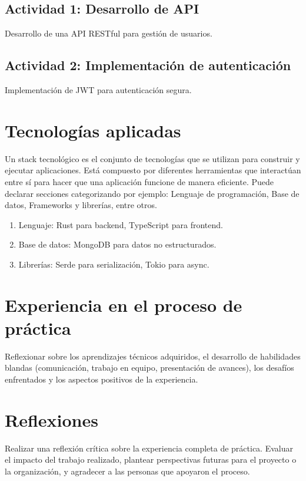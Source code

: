 \documentclass[12pt, a4paper]{article}
\begin{document}
\subsection{Actividad 1: Desarrollo de API}
Desarrollo de una API RESTful para gestión de usuarios.

\subsection{Actividad 2: Implementación de autenticación}
Implementación de JWT para autenticación segura.

\section{Tecnologías aplicadas}
Un stack tecnológico es el conjunto de tecnologías que se utilizan para construir y ejecutar aplicaciones. Está compuesto por diferentes herramientas que interactúan entre sí para hacer que una aplicación funcione de manera eficiente. Puede declarar secciones categorizando por ejemplo: Lenguaje de programación, Base de datos, Frameworks y librerías, entre otros.

\begin{enumerate}
    \item Lenguaje: Rust para backend, TypeScript para frontend.
    \item Base de datos: MongoDB para datos no estructurados.
    \item Librerías: Serde para serialización, Tokio para async.
\end{enumerate}

\section{Experiencia en el proceso de práctica}
Reflexionar sobre los aprendizajes técnicos adquiridos, el desarrollo de habilidades blandas (comunicación, trabajo en equipo, presentación de avances), los desafíos enfrentados y los aspectos positivos de la experiencia.

\section{Reflexiones}
Realizar una reflexión crítica sobre la experiencia completa de práctica. Evaluar el impacto del trabajo realizado, plantear perspectivas futuras para el proyecto o la organización, y agradecer a las personas que apoyaron el proceso.
\end{document}
